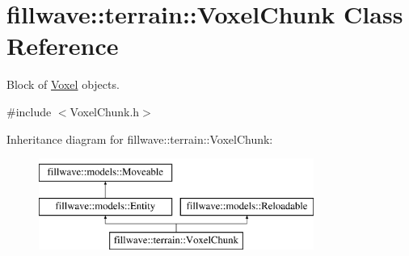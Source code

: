 \hypertarget{classfillwave_1_1terrain_1_1VoxelChunk}{}\section{fillwave\+:\+:terrain\+:\+:Voxel\+Chunk Class Reference}
\label{classfillwave_1_1terrain_1_1VoxelChunk}


Block of \hyperlink{classfillwave_1_1terrain_1_1Voxel}{Voxel} objects.  




{\ttfamily \#include $<$Voxel\+Chunk.\+h$>$}

Inheritance diagram for fillwave\+:\+:terrain\+:\+:Voxel\+Chunk\+:\begin{figure}[H]
\begin{center}
\leavevmode
\includegraphics[height=3.000000cm]{classfillwave_1_1terrain_1_1VoxelChunk}
\end{center}
\end{figure}
